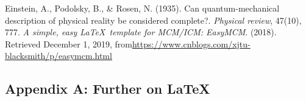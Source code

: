 \documentclass[12pt]{article}  %
\begin{document}
\begin{thebibliography}{99}
 Einstein, A., Podolsky, B., \& Rosen, N. (1935). Can quantum-mechanical description of physical reality be considered complete?. \emph{Physical review}, 47(10), 777.
 \emph{A simple, easy \LaTeX\ template for MCM/ICM: EasyMCM}. (2018). Retrieved December 1, 2019, from\url{https://www.cnblogs.com/xjtu-blacksmith/p/easymcm.html}
\end{thebibliography}


\begin{subappendices}  %

\section{Appendix A: Further on \LaTeX}



\end{subappendices}
\end{document}
